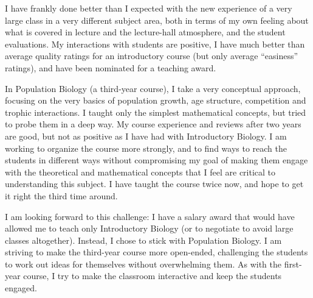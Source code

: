 \documentclass[12pt]{article}
\begin{document}
I have frankly done better than I expected with the new experience of a very large class in a very different subject area, both in terms of my own feeling about what is covered in lecture and the lecture-hall atmosphere, and the student evaluations.  My interactions with students are positive, I have much better than average quality ratings for an introductory course (but only average ``easiness'' ratings), and have been nominated for a teaching award.

In Population Biology (a third-year course), I take a very conceptual approach, focusing on the very basics of population growth, age structure, competition and trophic interactions.  I taught only the simplest mathematical concepts, but tried to probe them in a deep way.  My course experience and reviews after two years are good, but not as positive as I have had with Introductory Biology.  I am working to organize the course more strongly, and to find ways to reach the students in different ways without compromising my goal of making them engage with the theoretical and mathematical concepts that I feel are critical to understanding this subject.  I have taught the course twice now, and hope to get it right the third time around.

I am looking forward to this challenge: I have a salary award that would have allowed me to teach only Introductory Biology (or to negotiate to avoid large classes altogether).  Instead, I chose to stick with Population Biology.  I am striving to make the third-year course more open-ended, challenging the students to work out ideas for themselves without overwhelming them.  As with the first-year course, I try to make the classroom interactive and keep the students engaged.
\end{document}

